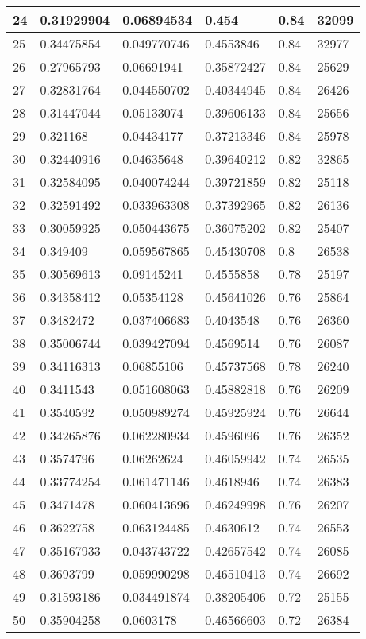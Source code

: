 \begin{longtable}{|l|l|l|l|l|l|}
24 & 0.31929904 & 0.06894534 & 0.454 & 0.84 & 32099 \\ \hline 
25 & 0.34475854 & 0.049770746 & 0.4553846 & 0.84 & 32977 \\ \hline 
26 & 0.27965793 & 0.06691941 & 0.35872427 & 0.84 & 25629 \\ \hline 
27 & 0.32831764 & 0.044550702 & 0.40344945 & 0.84 & 26426 \\ \hline 
28 & 0.31447044 & 0.05133074 & 0.39606133 & 0.84 & 25656 \\ \hline 
29 & 0.321168 & 0.04434177 & 0.37213346 & 0.84 & 25978 \\ \hline 
30 & 0.32440916 & 0.04635648 & 0.39640212 & 0.82 & 32865 \\ \hline 
31 & 0.32584095 & 0.040074244 & 0.39721859 & 0.82 & 25118 \\ \hline 
32 & 0.32591492 & 0.033963308 & 0.37392965 & 0.82 & 26136 \\ \hline 
33 & 0.30059925 & 0.050443675 & 0.36075202 & 0.82 & 25407 \\ \hline 
34 & 0.349409 & 0.059567865 & 0.45430708 & 0.8 & 26538 \\ \hline 
35 & 0.30569613 & 0.09145241 & 0.4555858 & 0.78 & 25197 \\ \hline 
36 & 0.34358412 & 0.05354128 & 0.45641026 & 0.76 & 25864 \\ \hline 
37 & 0.3482472 & 0.037406683 & 0.4043548 & 0.76 & 26360 \\ \hline 
38 & 0.35006744 & 0.039427094 & 0.4569514 & 0.76 & 26087 \\ \hline 
39 & 0.34116313 & 0.06855106 & 0.45737568 & 0.78 & 26240 \\ \hline 
40 & 0.3411543 & 0.051608063 & 0.45882818 & 0.76 & 26209 \\ \hline 
41 & 0.3540592 & 0.050989274 & 0.45925924 & 0.76 & 26644 \\ \hline 
42 & 0.34265876 & 0.062280934 & 0.4596096 & 0.76 & 26352 \\ \hline 
43 & 0.3574796 & 0.06262624 & 0.46059942 & 0.74 & 26535 \\ \hline 
44 & 0.33774254 & 0.061471146 & 0.4618946 & 0.74 & 26383 \\ \hline 
45 & 0.3471478 & 0.060413696 & 0.46249998 & 0.76 & 26207 \\ \hline 
46 & 0.3622758 & 0.063124485 & 0.4630612 & 0.74 & 26553 \\ \hline 
47 & 0.35167933 & 0.043743722 & 0.42657542 & 0.74 & 26085 \\ \hline 
48 & 0.3693799 & 0.059990298 & 0.46510413 & 0.74 & 26692 \\ \hline 
49 & 0.31593186 & 0.034491874 & 0.38205406 & 0.72 & 25155 \\ \hline 
50 & 0.35904258 & 0.0603178 & 0.46566603 & 0.72 & 26384 \\ \hline 
\end{longtable}